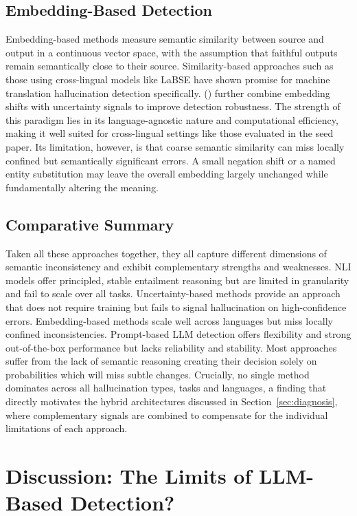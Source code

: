 \documentclass[
  seminar,   	 
  english,   	 
  titlepage=on,
  captions=tableheadings
]{ttlab-qualify}
\begin{document}
\subsection{Embedding-Based Detection}
Embedding-based methods measure semantic similarity between source and output in a continuous vector space, with the assumption that faithful outputs remain semantically close to their source. Similarity-based approaches such as those using cross-lingual models like LaBSE have shown promise for machine translation hallucination detection specifically. (\cite{Hu2024Embedding}) further combine embedding shifts with uncertainty signals to improve detection robustness. The strength of this paradigm lies in its language-agnostic nature and computational efficiency, making it well suited for cross-lingual settings like those evaluated in the seed paper. Its limitation, however, is that coarse semantic similarity can miss locally confined but semantically significant errors. A small negation shift or a named entity substitution may leave the overall embedding largely unchanged while fundamentally altering the meaning.

\subsection{Comparative Summary}
Taken all these approaches together, they all capture different dimensions of semantic inconsistency and exhibit complementary strengths and weaknesses. NLI models offer principled, stable entailment reasoning but are limited in granularity and fail to scale over all tasks. Uncertainty-based methods provide an approach that does not require training but fails to signal hallucination on high-confidence errors. Embedding-based methods scale well across languages but miss locally confined inconsistencies. Prompt-based LLM detection offers flexibility and strong out-of-the-box performance but lacks reliability and stability. Most approaches suffer from the lack of semantic reasoning creating their decision solely on probabilities which will miss subtle changes. Crucially, no single method dominates across all hallucination types, tasks and languages, a finding that directly motivates the hybrid architectures discussed in Section~\ref{sec:diagnosis}, where complementary signals are combined to compensate for the individual limitations of each approach.

\section{Discussion: The Limits of LLM-Based Detection?}
\label{sec:discussion}
\end{document}
